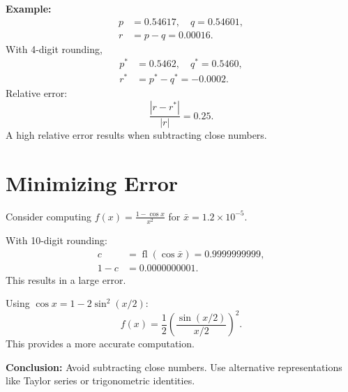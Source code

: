 \documentclass[12pt]{article}
\DeclareMathOperator{\fl}{fl}
\begin{document}
\textbf{Example:}
\begin{align*}
    p &= 0.54617, \quad q = 0.54601, \\
    r &= p - q = 0.00016.
\end{align*}
With 4-digit rounding,
\begin{align*}
    p^* &= 0.5462, \quad q^* = 0.5460, \\
    r^* &= p^* - q^* = -0.0002.
\end{align*}
Relative error:
\begin{equation*}
    \frac{|r - r^*|}{|r|} = 0.25.
\end{equation*}
A high relative error results when subtracting close numbers.

\section{Minimizing Error}

Consider computing $f(x) = \frac{1 - \cos x}{x^2}$ for $\bar{x} = 1.2 \times 10^{-5}$.

With 10-digit rounding:
\begin{align*}
    c &= \fl(\cos \bar{x}) = 0.9999999999, \\
    1 - c &= 0.0000000001.
\end{align*}
This results in a large error.

Using $\cos x = 1 - 2\sin^2(x/2)$:
\begin{equation*}
    f(x) = \frac{1}{2} \left( \frac{\sin(x/2)}{x/2} \right)^2.
\end{equation*}
This provides a more accurate computation.

\textbf{Conclusion:} Avoid subtracting close numbers. Use alternative 
representations like Taylor series or trigonometric identities.
\end{document}
